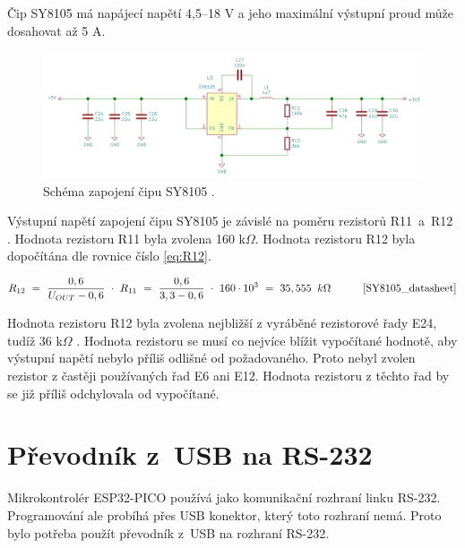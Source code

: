   Čip SY8105 má napájecí napětí 4,5--18 V a jeho maximální výstupní proud může dosahovat až 5 A.

  \begin{figure}[!h]
    \begin{center}
      \includegraphics[scale=0.4]{obrazky/SY8105_schema.png}
    \end{center}
    \caption[Schéma zapojení čipu SY8105 \cite{SY8105_datasheet}]{Schéma zapojení čipu SY8105 \cite{SY8105_datasheet}.}
  \end{figure}

  Výstupní napětí zapojení čipu SY8105 je závislé na poměru rezistorů R11~a~R12 \cite{SY8105_datasheet}. 
  Hodnota rezistoru R11 byla zvolena 160 k$\Omega$. Hodnota rezistoru R12 byla dopočítána dle 
  rovnice číslo \ref{eq:R12}.

  \begin{equation} 
    R_{12}~=~\frac{0,6}{U_{OUT}-0,6}~\cdot~R_{11}~=~\frac{0,6}{3,3-0,6}~\cdot~160\cdot10^3~=~35,555~\:k\Omega 
    \quad \quad \quad \cite{SY8105_datasheet}
  \label{eq:R12}
  \end{equation}

  Hodnota rezistoru R12 byla zvolena nejbližší z vyráběné rezistorové řady E24, tudíž 36 k$\Omega$ \cite{Rezistorova_rada}. Hodnota 
  rezistoru se musí co nejvíce blížit vypočítané hodnotě, aby výstupní napětí nebylo příliš odlišné od požadovaného. Proto nebyl
  zvolen rezistor z častěji používaných řad E6 ani E12. Hodnota rezistoru z těchto řad by se již příliš odchylovala od vypočítané.

  \section{Převodník z~USB na RS-232}
  Mikrokontrolér ESP32-PICO používá jako komunikační rozhraní linku RS-232. Programování ale probíhá přes USB konektor, který toto rozhraní
  nemá. Proto bylo potřeba použít převodník z~USB na rozhraní RS-232.
  

